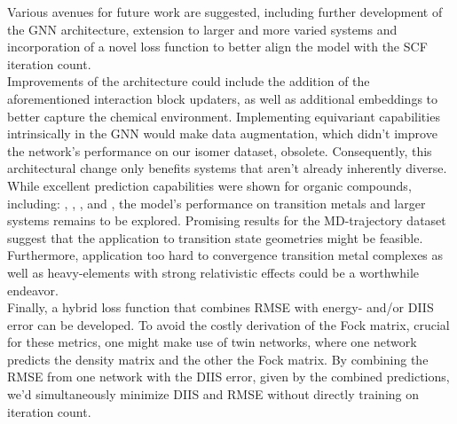 Various avenues for future work are suggested, including further development of the GNN architecture, extension to larger and more varied systems and incorporation of a novel loss function to better align the model with the SCF iteration count. \\
Improvements of the architecture could include the addition of the aforementioned interaction block updaters, as well as additional embeddings to better capture the chemical environment. Implementing equivariant capabilities intrinsically in the GNN would make data augmentation, which didn't improve the network's performance on our isomer dataset, obsolete. Consequently, this architectural change only benefits systems that aren't already inherently diverse.  \\
While excellent prediction capabilities were shown for organic compounds, including: , , ,  and , the model's performance on transition metals and larger systems remains to be explored. Promising results for the MD-trajectory dataset suggest that the application to transition state geometries might be feasible.
Furthermore, application too hard to convergence transition metal complexes as well as heavy-elements with strong relativistic effects could be a worthwhile endeavor. \\
Finally, a hybrid loss function that combines RMSE with energy- and/or DIIS error can be developed. To avoid the costly derivation of the Fock matrix, crucial for these metrics, one might make use of twin networks, where one network predicts the density matrix and the other the Fock matrix. By combining the RMSE from one network with the DIIS error, given by the combined predictions, we'd simultaneously minimize DIIS and RMSE without directly training on iteration count.
